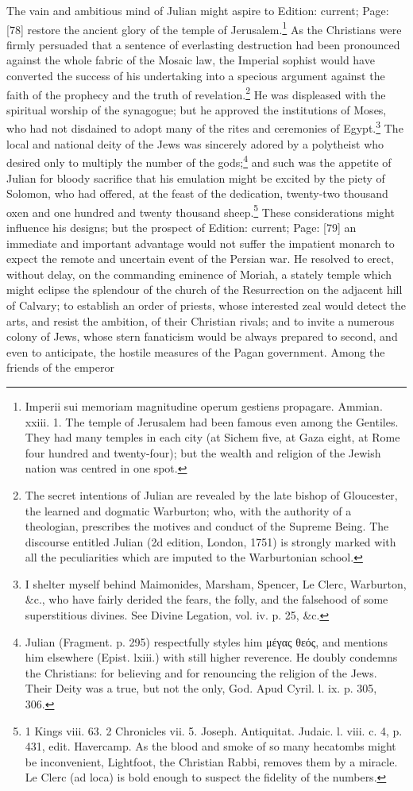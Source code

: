 The vain and ambitious mind of Julian might aspire to Edition: current; Page: [78] restore the ancient glory of the temple of Jerusalem.\footnote{Imperii sui memoriam magnitudine operum gestiens propagare. Ammian. xxiii. 1. The temple of Jerusalem had been famous even among the Gentiles. They had many temples in each city (at Sichem five, at Gaza eight, at Rome four hundred and twenty-four); but the wealth and religion of the Jewish nation was centred in one spot.} As the Christians were firmly persuaded that a sentence of everlasting destruction had been pronounced against the whole fabric of the Mosaic law, the Imperial sophist would have converted the success of his undertaking into a specious argument against the faith of the prophecy and the truth of revelation.\footnote{The secret intentions of Julian are revealed by the late bishop of Gloucester, the learned and dogmatic Warburton; who, with the authority of a theologian, prescribes the motives and conduct of the Supreme Being. The discourse entitled Julian (2d edition, London, 1751) is strongly marked with all the peculiarities which are imputed to the Warburtonian school.} He was displeased with the spiritual worship of the synagogue; but he approved the institutions of Moses, who had not disdained to adopt many of the rites and ceremonies of Egypt.\footnote{I shelter myself behind Maimonides, Marsham, Spencer, Le Clerc, Warburton, \&c., who have fairly derided the fears, the folly, and the falsehood of some superstitious divines. See Divine Legation, vol. iv. p. 25, \&c.} The local and national deity of the Jews was sincerely adored by a polytheist who desired only to multiply the number of the gods;\footnote{Julian (Fragment. p. 295) respectfully styles him \textgreek{μέγας θεός}, and mentions him elsewhere (Epist. lxiii.) with still higher reverence. He doubly condemns the Christians: for believing and for renouncing the religion of the Jews. Their Deity was a true, but not the only, God. Apud Cyril. l. ix. p. 305, 306.} and such was the appetite of Julian for bloody sacrifice that his emulation might be excited by the piety of Solomon, who had offered, at the feast of the dedication, twenty-two thousand oxen and one hundred and twenty thousand sheep.\footnote{1 Kings viii. 63. 2 Chronicles vii. 5. Joseph. Antiquitat. Judaic. l. viii. c. 4, p. 431, edit. Havercamp. As the blood and smoke of so many hecatombs might be inconvenient, Lightfoot, the Christian Rabbi, removes them by a miracle. Le Clerc (ad loca) is bold enough to suspect the fidelity of the numbers.} These considerations might influence his designs; but the prospect of Edition: current; Page: [79] an immediate and important advantage would not suffer the impatient monarch to expect the remote and uncertain event of the Persian war. He resolved to erect, without delay, on the commanding eminence of Moriah, a stately temple which might eclipse the splendour of the church of the Resurrection on the adjacent hill of Calvary; to establish an order of priests, whose interested zeal would detect the arts, and resist the ambition, of their Christian rivals; and to invite a numerous colony of Jews, whose stern fanaticism would be always prepared to second, and even to anticipate, the hostile measures of the Pagan government. Among the friends of the emperor 